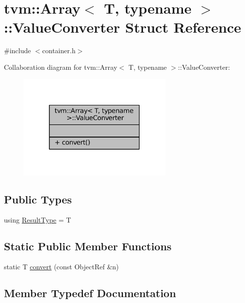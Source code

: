 \hypertarget{structtvm_1_1Array_1_1ValueConverter}{}\section{tvm\+:\+:Array$<$ T, typename $>$\+:\+:Value\+Converter Struct Reference}
\label{structtvm_1_1Array_1_1ValueConverter}


{\ttfamily \#include $<$container.\+h$>$}



Collaboration diagram for tvm\+:\+:Array$<$ T, typename $>$\+:\+:Value\+Converter\+:
\nopagebreak
\begin{figure}[H]
\begin{center}
\leavevmode
\includegraphics[width=218pt]{structtvm_1_1Array_1_1ValueConverter__coll__graph}
\end{center}
\end{figure}
\subsection*{Public Types}
\begin{DoxyCompactItemize}
\item 
using \hyperlink{structtvm_1_1Array_1_1ValueConverter_a27595671e0540369dd58f6a49622b3c2}{Result\+Type} = T
\end{DoxyCompactItemize}
\subsection*{Static Public Member Functions}
\begin{DoxyCompactItemize}
\item 
static T \hyperlink{structtvm_1_1Array_1_1ValueConverter_a0401a5aec9c7fa5f4d4388a835528434}{convert} (const Object\+Ref \&n)
\end{DoxyCompactItemize}


\subsection{Member Typedef Documentation}
